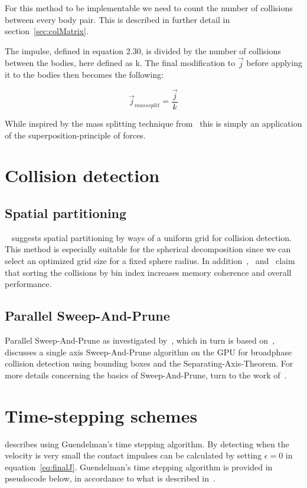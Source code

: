 For this method to be implementable we need to count the number of collisions between
every body pair. This is described in further detail in section~\ref{sec:colMatrix}.

The impulse, defined in equation 2.30, is divided by the number of collisions
 between the bodies, here defined as k. The final modification to
$\vec{j}$ before applying it to the bodies then becomes the following:

\begin{equation}
  \vec{j}_{mass split} = \frac{\vec{j}}{k}
\end{equation}

While inspired by the mass splitting technique from~\cite{tonge}
this is simply an application of the superposition-principle
of forces.

\section{Collision detection}\label{sec:gridCD}
\subsection{Spatial partitioning}
~\cite{gpugems} suggests spatial partitioning
by ways of a uniform grid for collision detection. This method is especially suitable
for the spherical decomposition since we can select an optimized
grid size for a fixed sphere radius. In addition~\cite{gpugems},~\cite{green} and~\cite{fastnearest} claim that sorting
the collisions by bin index increases memory coherence and overall performance.

\subsection{Parallel Sweep-And-Prune}
Parallel Sweep-And-Prune as investigated by~\cite{gpupipedev}, which in turn is based on~\cite{liu2010}, %
discusses a single axis Sweep-And-Prune algorithm on the GPU for broadphase collision
detection using bounding boxes and the Separating-Axis-Theorem. For more details
concerning the basics of Sweep-And-Prune, turn to the work of~\cite{SAPPierre}.

\section{Time-stepping schemes}
\cite{Lembcke} describes using Guendelman's time stepping
algorithm. By detecting when the velocity is very small the contact impulses can be
calculated by setting $\epsilon = 0$ in equation~\ref{eq:finalJ}.
Guendelman's time stepping algorithm is provided in pseudocode below, in accordance
to what is described in~\cite{guendelman}.

